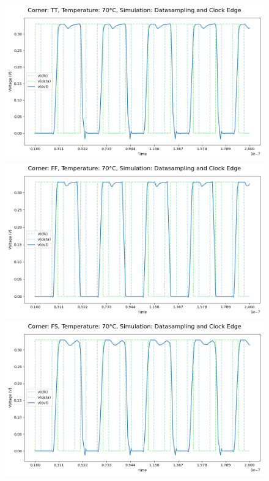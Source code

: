 \begin{figure}[H]
    \centering
    \includegraphics[height= 0.21\textheight]{figures/aimspice/TT/70/W1.csv.png}
    \vspace{5pt}
    \includegraphics[height= 0.21\textheight]{figures/aimspice/FF/70/W1.csv.png}
    \vspace{5pt}
    \includegraphics[height= 0.21\textheight]{figures/aimspice/FS/70/W1.csv.png}

\end{figure}
